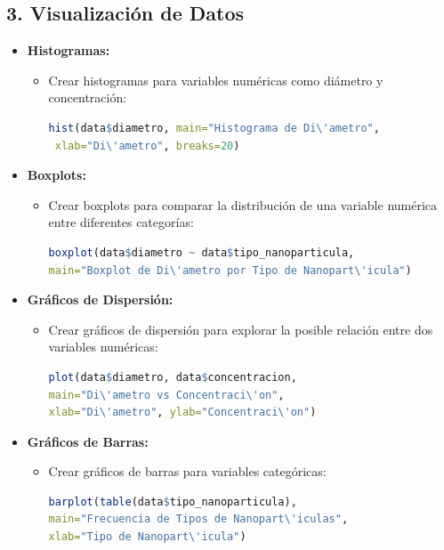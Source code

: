 \documentclass{article}
\begin{document}
\subsection*{3. Visualizaci\'on de Datos}
\begin{itemize}
    \item \textbf{Histogramas:}
    \begin{itemize}
        \item Crear histogramas para variables num\'ericas como di\'ametro y concentraci\'on:
        \begin{lstlisting}[language=R]
 hist(data$diametro, main="Histograma de Di\'ametro",
 xlab="Di\'ametro", breaks=20)
        \end{lstlisting}
    \end{itemize}

    \item \textbf{Boxplots:}
    \begin{itemize}
        \item Crear boxplots para comparar la distribuci\'on de una variable num\'erica entre diferentes categor\'ias:
        \begin{lstlisting}[language=R]
boxplot(data$diametro ~ data$tipo_nanoparticula,
main="Boxplot de Di\'ametro por Tipo de Nanopart\'icula")
        \end{lstlisting}
    \end{itemize}

    \item \textbf{Gr\'aficos de Dispersi\'on:}
    \begin{itemize}
        \item Crear gr\'aficos de dispersi\'on para explorar la posible  relaci\'on entre dos variables num\'ericas:
        \begin{lstlisting}[language=R]
plot(data$diametro, data$concentracion, 
main="Di\'ametro vs Concentraci\'on",
xlab="Di\'ametro", ylab="Concentraci\'on")
        \end{lstlisting}
    \end{itemize}

    \item \textbf{Gr\'aficos de Barras:}
    \begin{itemize}
        \item Crear gr\'aficos de barras para variables categóricas:
        \begin{lstlisting}[language=R]
barplot(table(data$tipo_nanoparticula), 
main="Frecuencia de Tipos de Nanopart\'iculas", 
xlab="Tipo de Nanopart\'icula")
        \end{lstlisting}
    \end{itemize}
\end{itemize}
\end{document}

